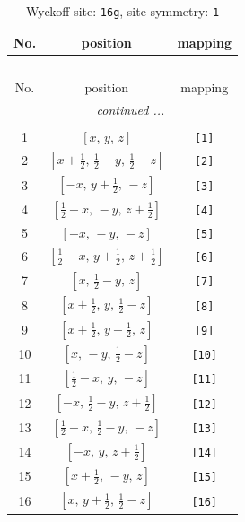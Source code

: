 \documentclass[fleqn,8pt]{jsarticle}
\begin{document}
\begin{longtable}{ccc}
\caption{Wyckoff site: {\tt 16g}, site symmetry: {\tt 1}}
 \\
 \hline \hline
No. & position & mapping \\ \hline \endfirsthead

\multicolumn{2}{l}{\tablename\ \thetable{}} \\
 \hline \hline
No. & position & mapping \\ \hline \endhead

 \hline \hline
\multicolumn{2}{r}{\footnotesize\it continued ...} \\ \endfoot

 \hline \hline
\multicolumn{2}{r}{} \\ \endlastfoot

1 & $\left[ x,\, y,\, z \right]$ & {\tt [1]} \\ \hline
2 & $\left[ x + \frac{1}{2},\, \frac{1}{2} - y,\, \frac{1}{2} - z \right]$ & {\tt [2]} \\ \hline
3 & $\left[ - x,\, y + \frac{1}{2},\, - z \right]$ & {\tt [3]} \\ \hline
4 & $\left[ \frac{1}{2} - x,\, - y,\, z + \frac{1}{2} \right]$ & {\tt [4]} \\ \hline
5 & $\left[ - x,\, - y,\, - z \right]$ & {\tt [5]} \\ \hline
6 & $\left[ \frac{1}{2} - x,\, y + \frac{1}{2},\, z + \frac{1}{2} \right]$ & {\tt [6]} \\ \hline
7 & $\left[ x,\, \frac{1}{2} - y,\, z \right]$ & {\tt [7]} \\ \hline
8 & $\left[ x + \frac{1}{2},\, y,\, \frac{1}{2} - z \right]$ & {\tt [8]} \\ \hline
9 & $\left[ x + \frac{1}{2},\, y + \frac{1}{2},\, z \right]$ & {\tt [9]} \\ \hline
10 & $\left[ x,\, - y,\, \frac{1}{2} - z \right]$ & {\tt [10]} \\ \hline
11 & $\left[ \frac{1}{2} - x,\, y,\, - z \right]$ & {\tt [11]} \\ \hline
12 & $\left[ - x,\, \frac{1}{2} - y,\, z + \frac{1}{2} \right]$ & {\tt [12]} \\ \hline
13 & $\left[ \frac{1}{2} - x,\, \frac{1}{2} - y,\, - z \right]$ & {\tt [13]} \\ \hline
14 & $\left[ - x,\, y,\, z + \frac{1}{2} \right]$ & {\tt [14]} \\ \hline
15 & $\left[ x + \frac{1}{2},\, - y,\, z \right]$ & {\tt [15]} \\ \hline
16 & $\left[ x,\, y + \frac{1}{2},\, \frac{1}{2} - z \right]$ & {\tt [16]} \\
\end{longtable}
\end{document}
